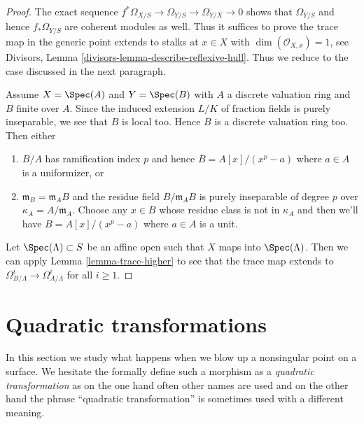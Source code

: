 \begin{proof}
The exact sequence $f^*\Omega_{X/S} \to \Omega_{Y/S} \to \Omega_{Y/X} \to 0$
shows that $\Omega_{Y/S}$ and hence $f_*\Omega_{Y/S}$ are coherent modules
as well. Thus it suffices to prove the trace map in the generic point
extends to stalks at $x \in X$ with $\dim(\mathcal{O}_{X, x}) = 1$, see
Divisors, Lemma \ref{divisors-lemma-describe-reflexive-hull}.
Thus we reduce to the case discussed in the next paragraph.

\medskip\noindent
Assume $X = \Spec(A)$ and $Y = \Spec(B)$ with $A$ a discrete valuation
ring and $B$ finite over $A$. Since the induced extension $L/K$
of fraction fields is purely inseparable, we see that $B$ is local too.
Hence $B$ is a discrete valuation ring too. Then either
\begin{enumerate}
\item $B/A$ has ramification index $p$ and hence $B = A[x]/(x^p - a)$
where $a \in A$ is a uniformizer, or
\item $\mathfrak m_B = \mathfrak m_A B$ and the residue field
$B/\mathfrak m_A B$ is purely inseparable of degree $p$ over
$\kappa_A = A/\mathfrak m_A$.
Choose any $x \in B$ whose residue class is not in $\kappa_A$
and then we'll have $B = A[x]/(x^p - a)$ where $a \in A$ is
a unit.
\end{enumerate}
Let $\Spec(\Lambda) \subset S$ be an affine open such that
$X$ maps into $\Spec(\Lambda)$. Then we can apply
Lemma \ref{lemma-trace-higher}
to see that the trace map extends to
$\Omega^i_{B/\Lambda} \to \Omega^i_{A/\Lambda}$
for all $i \geq 1$.
\end{proof}


















\section{Quadratic transformations}
\label{section-quadratic}

\noindent
In this section we study what happens when we blow up a nonsingular point
on a surface. We hesitate the formally define such a morphism as a
{\it quadratic transformation} as on the one hand often other names are
used and on the other hand the phrase ``quadratic transformation'' is
sometimes used with a different meaning.

